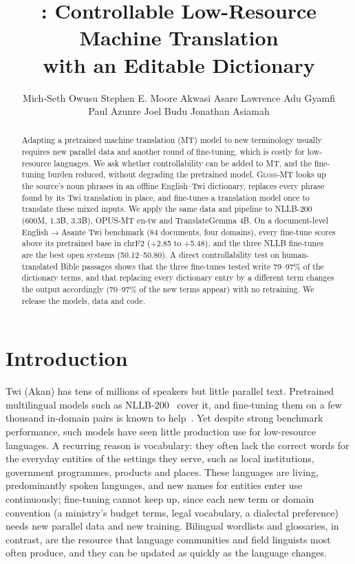 \documentclass[10pt,twocolumn]{article}
\title{\gm: Controllable Low-Resource Machine Translation\\with an Editable Dictionary}
\author{%
Mich-Seth Owusu \quad Stephen E. Moore \quad Akwasi Asare \quad Lawrence Adu Gyamfi\\
Paul Azunre \quad Joel Budu \quad Jonathan Asiamah}
\date{}
\newcommand{\gm}{\textsc{Gloss-MT}}
\begin{document}
\maketitle

\begin{abstract}
Adapting a pretrained machine translation (MT) model to new terminology usually requires new parallel data and another round of fine-tuning, which is costly for low-resource languages. We ask whether controllability can be added to MT, and the fine-tuning burden reduced, without degrading the pretrained model. \gm{} looks up the source's noun phrases in an offline English--Twi dictionary, replaces every phrase found by its Twi translation in place, and fine-tunes a translation model once to translate these mixed inputs. We apply the same data and pipeline to NLLB-200 (600M, 1.3B, 3.3B), OPUS-MT en-tw and TranslateGemma 4B. On a document-level English$\rightarrow$Asante Twi benchmark (84 documents, four domains), every fine-tune scores above its pretrained base in chrF2 (+2.85 to +5.48), and the three NLLB fine-tunes are the best open systems (50.12--50.80). A direct controllability test on human-translated Bible passages shows that the three fine-tunes tested write 79--97\% of the dictionary terms, and that replacing every dictionary entry by a different term changes the output accordingly (70--97\% of the new terms appear) with no retraining. We release the models, data and code.
\end{abstract}

\section{Introduction}

Twi (Akan) has tens of millions of speakers but little parallel text. Pretrained multilingual models such as NLLB-200~\cite{nllb2022} cover it, and fine-tuning them on a few thousand in-domain pairs is known to help~\cite{adelani2022few}. Yet despite strong benchmark performance, such models have seen little production use for low-resource languages. A recurring reason is vocabulary: they often lack the correct words for the everyday entities of the settings they serve, such as local institutions, government programmes, products and places. These languages are living, predominantly spoken languages, and new names for entities enter use continuously; fine-tuning cannot keep up, since each new term or domain convention (a ministry's budget terms, legal vocabulary, a dialectal preference) needs new parallel data and new training. Bilingual wordlists and glossaries, in contrast, are the resource that language communities and field linguists most often produce, and they can be updated as quickly as the language changes.
\end{document}
